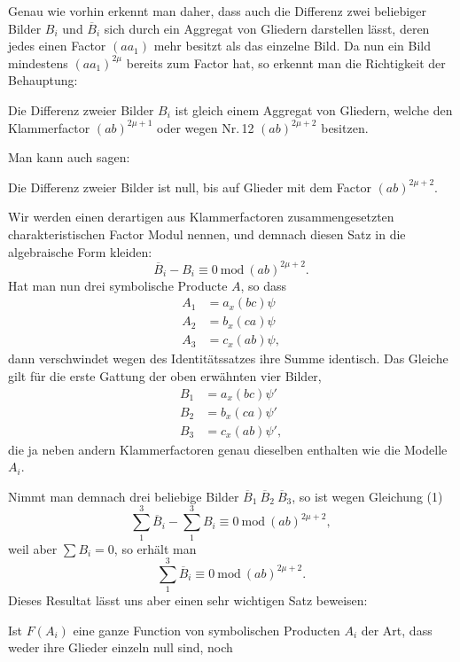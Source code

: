 \documentclass[11pt]{article}
\providecommand{\weberpage}[1]{}
\providecommand{\weq}[2]{\begin{equation}\tag{#1}#2\end{equation}}
\begin{document}
\weberpage{46}
Genau wie vorhin erkennt man daher, dass auch die Differenz zwei beliebiger
Bilder $B_i$ und $\overline{B}_i$ sich durch ein Aggregat von Gliedern
darstellen lässt, deren jedes einen Factor $(aa_1)$ mehr besitzt als das
einzelne Bild. Da nun ein Bild mindestens $(aa_1)^{2\mu}$ bereits zum Factor
hat, so erkennt man die Richtigkeit der Behauptung:

\glqq Die Differenz zweier Bilder $B_i$ ist gleich einem Aggregat von
Gliedern, welche den Klammerfactor $(ab)^{2\mu+1}$ oder wegen Nr.\,12
$(ab)^{2\mu+2}$ besitzen.\grqq{}

Man kann auch sagen:

\glqq Die Differenz zweier Bilder ist null, bis auf Glieder mit dem Factor
$(ab)^{2\mu+2}$.\grqq{}

Wir werden einen derartigen aus Klammerfactoren zusammengesetzten
charakteristischen Factor Modul nennen, und demnach diesen Satz in die
algebraische Form kleiden:
\weq{1}{\overline{B}_i-B_i\equiv 0\ \mathrm{mod}\ (ab)^{2\mu+2}.}
Hat man nun drei symbolische Producte $A$, so dass
\[
\begin{aligned}
A_1&=a_x(bc)\psi\\
A_2&=b_x(ca)\psi\\
A_3&=c_x(ab)\psi,
\end{aligned}
\]
dann verschwindet wegen des Identitätssatzes ihre Summe identisch. Das
Gleiche gilt für die erste Gattung der oben erwähnten vier Bilder,
\[
\begin{aligned}
B_1&=a_x(bc)\psi'\\
B_2&=b_x(ca)\psi'\\
B_3&=c_x(ab)\psi',
\end{aligned}
\]
die ja neben andern Klammerfactoren genau dieselben enthalten wie die
Modelle $A_i$.

Nimmt man demnach drei beliebige Bilder $\overline{B}_1\ \overline{B}_2\
\overline{B}_3$, so ist wegen Gleichung (1)
\[
\sum_1^3\overline{B}_i-\sum_1^3 B_i\equiv 0\ \mathrm{mod}\ (ab)^{2\mu+2},
\]
weil aber $\sum B_i=0$, so erhält man
\weq{2}{\sum_1^3\overline{B}_i\equiv 0\ \mathrm{mod}\ (ab)^{2\mu+2}.}
Dieses Resultat lässt uns aber einen sehr wichtigen Satz beweisen:

\glqq Ist $F(A_i)$ eine ganze Function von symbolischen Producten $A_i$ der
Art, dass weder ihre Glieder einzeln null sind, noch
\end{document}
